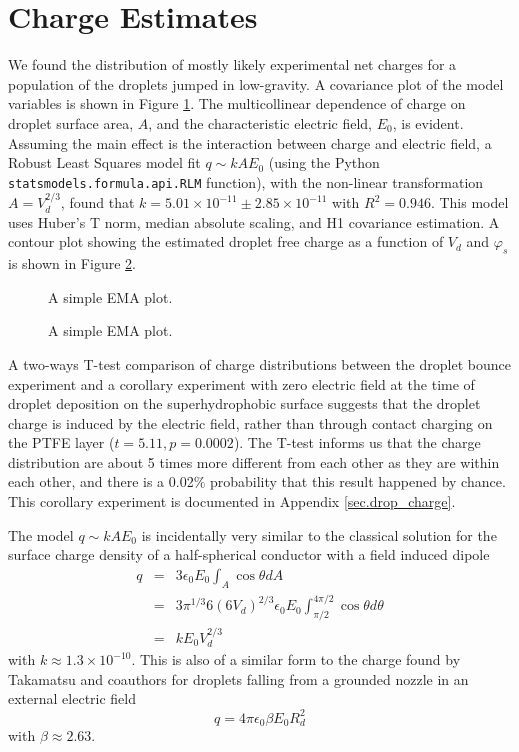 \documentclass[10pt,a4paper]{article}
\author{Erin Schmidt}
\begin{document}
\doublespacing
\section{Charge Estimates}
We found the distribution of mostly likely experimental net charges for a population of the droplets jumped in low-gravity. A covariance plot of the model variables is shown in Figure \ref{fig:scatter}. The multicollinear dependence of charge on droplet surface area, $A$, and the characteristic electric field, $E_0$, is evident. Assuming the main effect is the interaction between charge and electric field, a Robust Least Squares model fit $q \sim kAE_0$ (using the Python \verb|statsmodels.formula.api.RLM| function), with the non-linear transformation $A = V_d^{2/3}$, found that $k=5.01 \times 10^{-11} \pm  2.85 \times 10^{-11}$ with $R^2 = 0.946$. This model uses Huber's T norm, median absolute scaling, and H1 covariance estimation. A contour plot showing the estimated droplet free charge as a function of $V_d$ and $\varphi_s$ is shown in Figure \ref{fig:charge}.
\begin{figure}[htb]
    \centering
    \resizebox{12cm}{!}{}
    \caption{A simple EMA plot.\label{fig:scatter}}
\end{figure}
\begin{figure}[htb]
    \centering
    
    \caption{A simple EMA plot.\label{fig:charge}}
\end{figure}

A two-ways T-test comparison of charge distributions between the droplet bounce experiment and a corollary experiment with zero electric field at the time of droplet deposition on the superhydrophobic surface suggests that the droplet charge is induced by the electric field, rather than through contact charging on the PTFE layer ($t = 5.11, p = 0.0002$). The T-test informs us that the charge distribution  are about 5 times more different from each other as they are within each other, and there is a 0.02$\%$ probability that this result happened by chance. This corollary experiment is documented in Appendix \ref{sec.drop_charge}.

The model $q \sim kAE_0$ is incidentally very similar to the classical solution for the surface charge density of a half-spherical conductor with a field induced dipole \cite{david_j._griffiths_introduction_1999}
\begin{eqnarray*}
q &=& 3 \epsilon_0 E_0 \int_A \cos \theta dA \\
&=& 3 \pi^{1/3} 6 \left(6 V_d \right)^{2/3} \epsilon_0 E_0 \int^{4 \pi/2}_{\pi / 2} \cos \theta d\theta \\
&=& k E_0 V_d^{2/3}
\end{eqnarray*}
with $k \approx 1.3 \times 10^{-10}$. This is also of a similar form to the charge found by Takamatsu and coauthors for droplets falling from a grounded nozzle in an external electric field \cite{takamatsu_theoretical_1981}
\[q = 4 \pi \epsilon_0 \beta E_0 R_d^2 \]
with $\beta \approx 2.63$.
\end{document}
